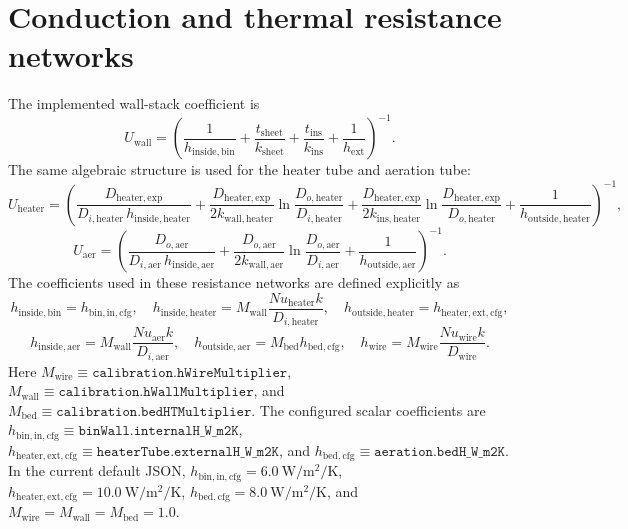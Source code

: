 \documentclass[11pt]{article}
\begin{document}
\section{Conduction and thermal resistance networks}
The implemented wall-stack coefficient is
\begin{equation}
\label{eq:bin_wall_u}
U_{\mathrm{wall}}=
\left(
\frac{1}{h_{\mathrm{inside,bin}}}
+\frac{t_{\mathrm{sheet}}}{k_{\mathrm{sheet}}}
+\frac{t_{\mathrm{ins}}}{k_{\mathrm{ins}}}
+\frac{1}{h_{\mathrm{ext}}}
\right)^{-1}.
\end{equation}
The same algebraic structure is used for the heater tube and aeration tube:
\begin{equation}
\label{eq:heater_overall_u}
U_{\mathrm{heater}}=
\left(
\frac{D_{\mathrm{heater,exp}}}{D_{i,\mathrm{heater}}\,h_{\mathrm{inside,heater}}}
+\frac{D_{\mathrm{heater,exp}}}{2k_{\mathrm{wall,heater}}}\ln\!\frac{D_{o,\mathrm{heater}}}{D_{i,\mathrm{heater}}}
+\frac{D_{\mathrm{heater,exp}}}{2k_{\mathrm{ins,heater}}}\ln\!\frac{D_{\mathrm{heater,exp}}}{D_{o,\mathrm{heater}}}
+\frac{1}{h_{\mathrm{outside,heater}}}
\right)^{-1},
\end{equation}
\begin{equation}
\label{eq:aeration_overall_u}
U_{\mathrm{aer}}=
\left(
\frac{D_{o,\mathrm{aer}}}{D_{i,\mathrm{aer}}\,h_{\mathrm{inside,aer}}}
+\frac{D_{o,\mathrm{aer}}}{2k_{\mathrm{wall,aer}}}\ln\!\frac{D_{o,\mathrm{aer}}}{D_{i,\mathrm{aer}}}
+\frac{1}{h_{\mathrm{outside,aer}}}
\right)^{-1}.
\end{equation}
The coefficients used in these resistance networks are defined explicitly as
\begin{equation}
\label{eq:coefficient_definitions}
h_{\mathrm{inside,bin}}=h_{\mathrm{bin,in,cfg}},\quad
h_{\mathrm{inside,heater}}=M_{\mathrm{wall}}\frac{Nu_{\mathrm{heater}}k}{D_{i,\mathrm{heater}}},\quad
h_{\mathrm{outside,heater}}=h_{\mathrm{heater,ext,cfg}},
\end{equation}
\begin{equation}
\label{eq:coefficient_definitions_continued}
h_{\mathrm{inside,aer}}=M_{\mathrm{wall}}\frac{Nu_{\mathrm{aer}}k}{D_{i,\mathrm{aer}}},\quad
h_{\mathrm{outside,aer}}=M_{\mathrm{bed}}h_{\mathrm{bed,cfg}},\quad
h_{\mathrm{wire}}=M_{\mathrm{wire}}\frac{Nu_{\mathrm{wire}}k}{D_{\mathrm{wire}}}.
\end{equation}
Here \(M_{\mathrm{wire}}\equiv\texttt{calibration.hWireMultiplier}\), \(M_{\mathrm{wall}}\equiv\texttt{calibration.hWallMultiplier}\), and \(M_{\mathrm{bed}}\equiv\texttt{calibration.bedHTMultiplier}\). The configured scalar coefficients are \(h_{\mathrm{bin,in,cfg}}\equiv\texttt{binWall.internalH\_W\_m2K}\), \(h_{\mathrm{heater,ext,cfg}}\equiv\texttt{heaterTube.externalH\_W\_m2K}\), and \(h_{\mathrm{bed,cfg}}\equiv\texttt{aeration.bedH\_W\_m2K}\). In the current default JSON, \(h_{\mathrm{bin,in,cfg}}=6.0\ \si{\watt\per\meter\squared\per\kelvin}\), \(h_{\mathrm{heater,ext,cfg}}=10.0\ \si{\watt\per\meter\squared\per\kelvin}\), \(h_{\mathrm{bed,cfg}}=8.0\ \si{\watt\per\meter\squared\per\kelvin}\), and \(M_{\mathrm{wire}}=M_{\mathrm{wall}}=M_{\mathrm{bed}}=1.0\).
\end{document}
